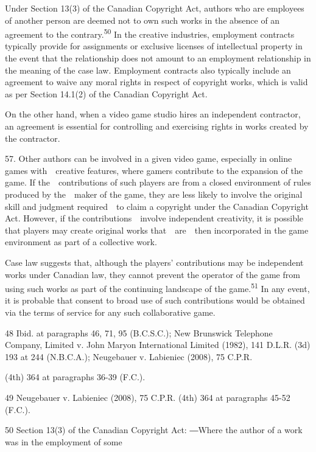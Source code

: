 \documentclass[
]{article}
\begin{document}
{Under Section 13(3) of the Canadian }{Copyright Act}{, authors who are
employees of another person are deemed not to own such works in the
absence of an agreement to the contrary.}\textsuperscript{{50 }}{In the
creative industries, employment contracts typically provide for
assignments or exclusive licenses of intellectual property in the event
that the relationship does not amount to an employment relationship in
the meaning of the case law. Employment contracts also typically include
an agreement to waive any moral rights in respect of copyright works,
which is valid as per Section 14.1(2) of the Canadian }{Copyright
Act}{.}

{On the other hand, when a video game studio hires an independent
contractor, an agreement is essential for controlling and exercising
rights in works created by the contractor.}

{57. }{Other authors can be involved in a given video game, especially
in online games with~~creative features, where gamers contribute to the
expansion of the game. If the~~contributions of such players are from a
closed environment of rules produced by the~~maker of the game, they are
less likely to involve the original skill and judgment required~~to
claim a copyright under the Canadian }{Copyright Act}{. However, if the
contributions~~involve independent creativity, it is possible that
players may create original works that~~are~~then incorporated in the
game environment as part of a collective work.}

{Case law suggests that, although the players' contributions may be
independent works }{under Canadian law, they cannot prevent the operator
of the game from using such works as part of the continuing landscape of
the game.}\textsuperscript{{51 }}{In any event, it is probable that
consent to broad use of such contributions would be obtained via the
terms of service for any such collaborative game.}

{48 }{Ibid. }{at paragraphs 46, 71, 95 (B.C.S.C.); }{New Brunswick
Telephone Company, Limited v. John Maryon International Limited
}{(1982), 141 D.L.R. (3d) 193 at 244 (N.B.C.A.); }{Neugebauer v.
Labieniec }{(2008), 75 C.P.R.}

{(4th) 364 at paragraphs 36-39 (F.C.).}

{49 }{Neugebauer v. Labieniec }{(2008), 75 C.P.R. (4th) 364 at
paragraphs 45-52 (F.C.).}

{50 }{Section 13(3) of the Canadian }{Copyright Act}{: }{―}{Where the
author of a work was in the employment of some}
\end{document}
